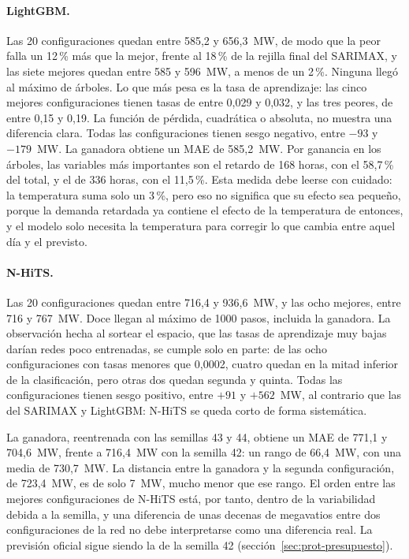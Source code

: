 \paragraph{LightGBM.} Las 20 configuraciones quedan entre 585,2 y 656,3~MW,
de modo que la peor falla un 12\,\% más que la mejor, frente al 18\,\% de la
rejilla final del SARIMAX, y las siete mejores quedan entre 585 y 596~MW, a
menos de un 2\,\%. Ninguna llegó al máximo de árboles. Lo que más
pesa es la tasa de aprendizaje: las cinco mejores configuraciones tienen tasas
de entre 0,029 y 0,032, y las tres peores, de entre 0,15 y 0,19. La función de
pérdida, cuadrática o absoluta, no muestra una diferencia clara. Todas las
configuraciones tienen sesgo negativo, entre $-93$ y $-179$~MW. La ganadora
obtiene un MAE de 585,2~MW. Por ganancia en los árboles, las variables más
importantes son el retardo de 168 horas, con el 58,7\,\% del total, y el de
336 horas, con el 11,5\,\%. Esta medida debe leerse con cuidado: la
temperatura suma solo un 3\,\%, pero eso no significa que su efecto sea
pequeño, porque la demanda retardada ya contiene el efecto de la temperatura
de entonces, y el modelo solo necesita la temperatura para corregir lo que
cambia entre aquel día y el previsto.

\paragraph{N-HiTS.} Las 20 configuraciones quedan entre 716,4 y 936,6~MW, y
las ocho mejores, entre 716 y 767~MW. Doce llegan al máximo de 1000 pasos,
incluida la ganadora. La observación hecha al sortear el espacio, que las
tasas de aprendizaje muy bajas darían redes poco entrenadas, se cumple solo
en parte: de las ocho configuraciones con tasas menores que 0,0002, cuatro
quedan en la mitad inferior de la clasificación, pero otras dos quedan
segunda y quinta. Todas las
configuraciones tienen sesgo positivo, entre $+91$ y $+562$~MW, al contrario
que las del SARIMAX y LightGBM: N-HiTS se queda corto de forma sistemática.

La ganadora, reentrenada con las semillas 43 y 44, obtiene un MAE de 771,1 y
704,6~MW, frente a 716,4~MW con la semilla 42: un rango de 66,4~MW, con una
media de 730,7~MW. La distancia entre la ganadora y la segunda configuración,
de 723,4~MW, es de solo 7~MW, mucho menor que ese rango. El orden entre las
mejores configuraciones de N-HiTS está, por tanto, dentro de la variabilidad
debida a la semilla, y una diferencia de unas decenas de megavatios entre dos
configuraciones de la red no debe interpretarse como una diferencia real. La
previsión oficial sigue siendo la de la semilla 42
(sección~\ref{sec:prot-presupuesto}).

